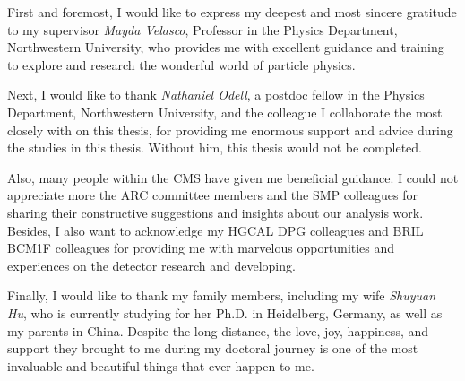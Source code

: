 \documentclass[12pt,reqno]{nuthesis}
\begin{document}
    \acknowledgements

    First and foremost, I would like to express my deepest and most sincere gratitude to my supervisor \textit{Mayda Velasco}, Professor in the Physics Department, Northwestern University, who provides me with excellent guidance and training to explore and research the wonderful world of particle physics. 

    Next, I would like to thank \textit{Nathaniel Odell}, a postdoc fellow in the Physics Department, Northwestern University, and the colleague I collaborate the most closely with on this thesis, for providing me enormous support and advice during the studies in this thesis. Without him, this thesis would not be completed. 

    Also, many people within the CMS have given me beneficial guidance. I could not appreciate more the ARC committee members and the SMP colleagues for sharing their constructive suggestions and insights about our analysis work. Besides, I also want to acknowledge my HGCAL DPG colleagues and BRIL BCM1F colleagues for providing me with marvelous opportunities and experiences on the detector research and developing.

    Finally, I would like to thank my family members, including my wife \textit{Shuyuan Hu}, who is currently studying for her Ph.D. in Heidelberg, Germany, as well as my parents in China. Despite the long distance, the love, joy, happiness, and support they brought to me during my doctoral journey is one of the most invaluable and beautiful things that ever happen to me.



    \clearpage{} 
    \setcounter{tocdepth}{2}
    \begin{spacing}{1.5}
        \tableofcontents	
    \end{spacing}

    \clearpage{} 
    \listoftables

    \clearpage{} 
    \listoffigures



    \mainmatter
    
    
    
    
    
    
    
\end{document}
